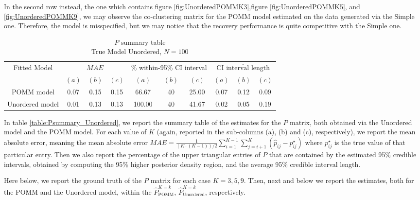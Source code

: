 \documentclass[11pt]{amsart}
\begin{document}
In the second row instead, the one which contains figure \ref{fig:UnorderedPOMMK3},figure \ref{fig:UnorderedPOMMK5}, and \ref{fig:UnorderedPOMMK9}, we may observe the co-clustering matrix for the POMM model estimated on the data generated via the Simple one. Therefore, the model is misspecified, but we may notice that the recovery performance is quite competitive with the Simple one.



\begin{table}[htbp]
\centering
\caption{
{\large $P$ summary table} \\ 
{\small True Model Unordered, $N=100$}
} 
\begin{tabular}{cccccccccc}
\toprule
\multirow{2}{*}{Fitted Model} & \multicolumn{3}{c}{
$MAE$ } & \multicolumn{3}{c}{
$\%$ within-95\% CI interval} & \multicolumn{3}{c}{ $\overline{\text{CI interval length}}$} \\
\cmidrule(lr){2-4} \cmidrule(lr){5-7} \cmidrule(lr){8-10}
& $(a)$ & $(b)$ & $(c)$ & $(a)$ & $(b)$ & $(c)$ & $(a)$ & $(b)$ & $(c)$ \\
\midrule
POMM model  &0.07 & 0.15 & 0.15 & 66.67 & 40 & 25.00 & 0.07 & 0.12 & 0.09 \\
Unordered model & 0.01 & 0.13 & 0.13 & 100.00 & 40 & 41.67 & 0.02 & 0.05 & 0.19  \\
\bottomrule
\end{tabular}
\label{table:Psummary_Unordered}
\end{table}

In table \eqref{table:Psummary_Unordered}, we report the summary table of the estimates for the $P$ matrix, both obtained via the Unordered model and the POMM model. For each value of $K$ (again, reported in the sub-columns (a), (b) and (c), respectively), we report the mean absolute error, meaning the mean absolute error $MAE = \frac{1}{(K\cdot(K-1))/2} \sum_{i=1}^{K-1}\sum_{j=i+1}^K \left(\hat{p}_{ij} - p^\star_{ij}\right)$ where $p^\star_{ij}$ is the true value of that particular entry. Then we also report the percentage of the upper triangular entries of $P$ that are contained by the estimated 95\% credible intervals, obtained by computing the 95\% higher posterior density region, and the average 95\% credible interval length. 

Here below, we report the ground truth of the $P$ matrix for each case $K=3,5,9$. Then, next and below we report the estimates, both for the POMM and the Unordered model, within the $\hat{P}^{K=k}_{\text{POMM}}$, $\hat{P}^{K=k}_{\text{Unordered}}$, respectively.
\end{document}
